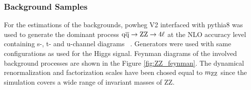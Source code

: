 \subsubsection{Background Samples}
For the estimations of the backgrounds, {\sc powheg V2} interfaced with {\sc pythia8} was used to generate the dominant process $\mathrm{q}\mathrm{\overline{q}} \rightarrow \mathrm{Z} \mathrm{Z} \rightarrow 4\ell$  at the NLO accuracy level containing
s-, t- and u-channel diagrams ~\cite{Nason:2013ydw}. Generators were used with same configurations as used for the Higgs signal. Feynman diagrams of the involved background processes are shown in the Figure \ref{fig:ZZ_feynman}.
The dynamical renormalization and factorization scales have been chosed equal to $m_{\mathrm{Z}\mathrm{Z}}$ since the simulation covers a wide range of invariant masses of ZZ.

